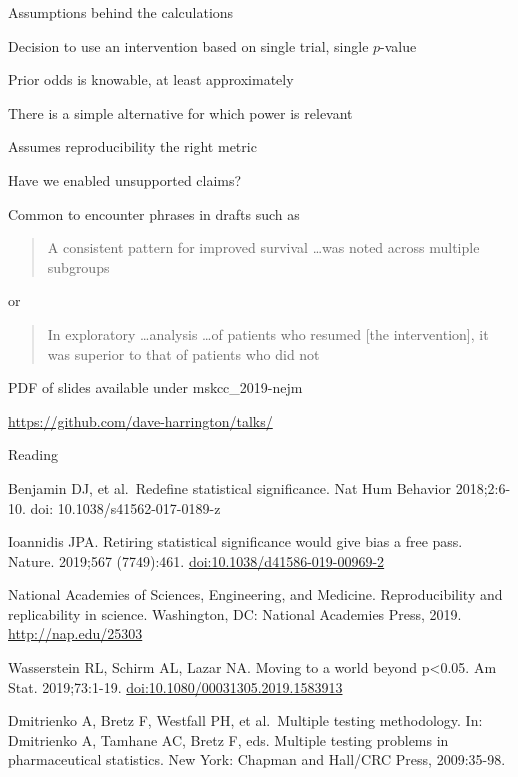 \documentclass[ignorenonframetext,]{beamer}
\begin{document}
\begin{frame}{Assumptions behind the calculations}
\protect\hypertarget{assumptions-behind-the-calculations}{}

Decision to use an intervention based on single trial, single
\(p\)-value

Prior odds is knowable, at least approximately

There is a simple alternative for which power is relevant

Assumes reproducibility the right metric

\end{frame}

\begin{frame}{Have we enabled unsupported claims?}
\protect\hypertarget{have-we-enabled-unsupported-claims}{}

Common to encounter phrases in drafts such as

\begin{quote} A consistent pattern for improved survival \ldots was noted across multiple subgroups
\end{quote}

or

\begin{quote}

In exploratory \ldots analysis \ldots of patients who resumed [the intervention], it  was superior to that of patients who did not

\end{quote}

\end{frame}

\begin{frame}

PDF of slides available under mskcc\_2019-nejm

\url{https://github.com/dave-harrington/talks/}

\end{frame}

\begin{frame}{Reading}
\protect\hypertarget{reading}{}

\small

Benjamin DJ, et al.~Redefine statistical significance. Nat Hum Behavior
2018;2:6-10. doi: 10.1038/s41562-017-0189-z

Ioannidis JPA. Retiring statistical significance would give bias a free
pass. Nature. 2019;567 (7749):461. \url{doi:10.1038/d41586-019-00969-2}

National Academies of Sciences, Engineering, and Medicine.
Reproducibility and replicability in science. Washington, DC: National
Academies Press, 2019. \url{http://nap.edu/25303}

Wasserstein RL, Schirm AL, Lazar NA. Moving to a world beyond
p\textless{}0.05. Am Stat. 2019;73:1-19.
\url{doi:10.1080/00031305.2019.1583913}

Dmitrienko A, Bretz F, Westfall PH, et al.~Multiple testing methodology.
In: Dmitrienko A, Tamhane AC, Bretz F, eds. Multiple testing problems in
pharmaceutical statistics. New York: Chapman and Hall/CRC Press,
2009:35-98.

\end{frame}
\end{document}
